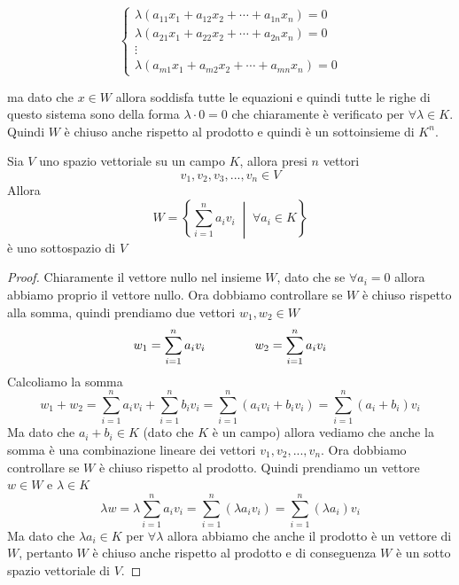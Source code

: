 \documentclass{rapport}
\begin{document}
  \[
 \begin{cases}
  \lambda (a_{11} x_1 + a_{12} x_2 + \cdots + a_{1n} x_n) = 0 \\
  \lambda (a_{21} x_1 + a_{22} x_2 + \cdots + a_{2n} x_n )= 0 \\
  \vdots \\
  \lambda (a_{m1} x_1 + a_{m2} x_2 + \cdots + a_{mn} x_n) = 0
\end{cases}
\]

ma dato che $x\in W$ allora soddisfa tutte le equazioni e quindi tutte le righe di questo sistema sono della forma $\lambda \cdot  0 = 0$ che chiaramente è verificato per $\forall \lambda \in K$. Quindi $W$ è chiuso anche rispetto al prodotto e quindi è un sottoinsieme di $K^n$.

\begin{teorema}{}{}
  Sia $V$ uno spazio vettoriale su un campo $K$, allora presi $n$ vettori 
  \[
  v_1, v_2, v_3, ..., v_n \in V
  \]
  Allora 
  \[
  W = \left\{\sum_{i=1}^{n}a_iv_i \;\middle|\; \forall a_i \in K \right\}
  \]
  è uno sottospazio di $V$
\end{teorema}
\begin{proof}{}
  Chiaramente il vettore nullo nel insieme $W$, dato che se $\forall a_i = 0$ allora abbiamo proprio il vettore nullo. Ora dobbiamo controllare se $W$ è chiuso rispetto alla somma, quindi prendiamo due vettori $w_1,w_2\in W$
  \[
\begin{array}{c@{\qquad}@{\qquad}c}
 \displaystyle w_1 = \sum_{i=1}^{n}a_iv_i & \displaystyle w_2 = \sum_{i=1}^{n}a_iv_i
\end{array}
  \]
  Calcoliamo la somma
  \[
  w_1+w_2 = \sum_{i=1}^{n}a_iv_i + \sum_{i=1}^{n}b_iv_i = \sum_{i=1}^{n}\left(a_iv_i + b_iv_i\right)= \sum_{i=1}^{n}\left(a_i + b_i\right)v_i
  \]
  Ma dato che $a_i+b_i \in K$ (dato che $K$ è un campo) allora vediamo che anche la somma è una combinazione lineare dei vettori $v_1, v_2, ..., v_n$. Ora dobbiamo controllare se $W$ è chiuso rispetto al prodotto. Quindi prendiamo un vettore $w \in W$ e $\lambda \in K$
  \[
  \lambda w = \lambda \sum_{i=1}^{n}a_iv_i  = \sum_{i=1}^{n}(\lambda a_iv_i)  = \sum_{i=1}^{n}(\lambda a_i)v_i
  \]
  Ma dato che $\lambda a_i\in K$ per $\forall \lambda$ allora abbiamo che anche il prodotto è un vettore di $W$, pertanto $W$ è chiuso anche rispetto al prodotto e di conseguenza $W$ è un sotto spazio vettoriale di $V$.
\end{proof}
\end{document}
